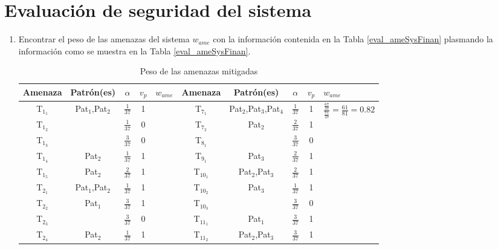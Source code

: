 \section{Evaluación de seguridad del sistema}

\begin{enumerate}[label=Paso \arabic*:,leftmargin=*,noitemsep]
\setcounter{enumi}{0}
	\item Encontrar el peso de las amenazas del sistema $w_{ame}$ con la información contenida en la Tabla \ref{eval_ameSysFinan} plasmando la información como se muestra en la Tabla \ref{eval_ameSysFinan}.
	
	\begin{table}[!ht]
	\caption{Peso de las amenazas mitigadas}
	\renewcommand{\arraystretch}{1.5}
	\begin{center}
	\scriptsize{
	\begin{tabular}{ |c|c|c|c|P{2cm}||c|c|c|c|P{2cm}|}
	\hline
		Amenaza&Patrón(es)&$\alpha$& $v_p$ & $w_{ame}$&Amenaza&Patrón(es)&$\alpha$& $v_p$ & $w_{ame}$ \\ \hline
		T$_{1_1}$&Pat$_1$,Pat$_2$&$\frac{1}{37}$&1&&T$_{7_1}$&Pat$_2$,Pat$_3$,Pat$_4$&$\frac{1}{37}$&1&\\ 
		T$_{1_2}$&&$\frac{1}{37}$&0&&T$_{7_2}$&Pat$_2$&$\frac{2}{37}$&1&\\  
		T$_{1_3}$&&$\frac{3}{37}$&0&&T$_{8_1}$&&$\frac{3}{37}$&0&\\ 
		T$_{1_4}$&Pat$_2$&$\frac{1}{37}$&1&&T$_{9_1}$&Pat$_3$&$\frac{2}{37}$&1&\\
		T$_{1_5}$&Pat$_2$&$\frac{2}{37}$&1&&T$_{10_1}$&Pat$_2$,Pat$_3$&$\frac{2}{37}$&1&\\
		T$_{2_1}$&Pat$_1$,Pat$_2$&$\frac{1}{37}$&1&&T$_{10_2}$&Pat$_3$&$\frac{1}{37}$&1&\\
		T$_{2_2}$&Pat$_1$&$\frac{3}{37}$&1&&T$_{10_3}$&&$\frac{3}{37}$&0&\\
		T$_{2_3}$&&$\frac{3}{37}$&0&&T$_{11_1}$&Pat$_1$&$\frac{3}{37}$&1&\\
		T$_{2_4}$&Pat$_2$&$\frac{1}{37}$&1&&T$_{11_2}$&Pat$_2$,Pat$_3$&$\frac{3}{37}$&1&\\

\end{tabular}}
\end{center}
\end{table}
\end{enumerate}
